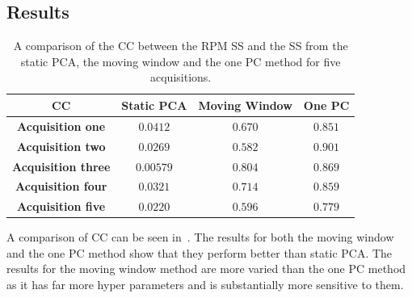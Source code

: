         \subsection{Results} \label{sec:pca_data_driven_surrogate_signal_extraction_methods_for_Dynamic_pet_results}
            \begin{table}
                \centering
                
                \captionsetup{singlelinecheck=false, justification=centering}
                \caption{A comparison of the \gls{CC} between the \gls{RPM} \gls{SS} and the \gls{SS} from the static \gls{PCA}, the moving window and the one \gls{PC} method for five acquisitions.}
                
                \resizebox*{1.0\linewidth}{!}
                {
                    \begin{tabular}{||c|ccc||}
                        \hline
                        \textbf{\gls{CC}} & \textbf{Static \gls{PCA}} & \textbf{Moving Window} & \textbf{One \gls{PC}} \\
                        \hline
                        \textbf{Acquisition one}    & $0.0412$  & $0.670$ & $0.851$ \\
                        \textbf{Acquisition two}    & $0.0269$  & $0.582$ & $0.901$ \\
                        \textbf{Acquisition three}  & $0.00579$ & $0.804$ & $0.869$ \\
                        \textbf{Acquisition four}   & $0.0321$  & $0.714$ & $0.859$ \\
                        \textbf{Acquisition five}   & $0.0220$  & $0.596$ & $0.779$ \\
                        \hline
                    \end{tabular}
                }
                \label{tab:pca_data_driven_surrogate_signal_extraction_methods_for_Dynamic_pet_cross_correlation}
            \end{table}
            
            A comparison of \gls{CC} can be seen in~. The results for both the moving window and the one \gls{PC} method show that they perform better than static \gls{PCA}. The results for the moving window method are more varied than the one \gls{PC} method as it has far more hyper parameters and is substantially more sensitive to them.
            
